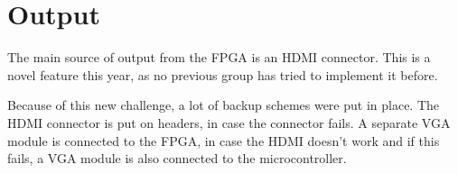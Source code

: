 \documentclass[../main/report.tex]{subfiles}
\begin{document}
\section{Output}
The main source of output from the FPGA is an HDMI connector.
This is a novel feature this year, as no previous group has tried to implement it before.

Because of this new challenge, a lot of backup schemes were put in place.
The HDMI connector is put on headers, in case the connector fails.
A separate VGA module is connected to the FPGA, in case the HDMI doesn't work and if this fails, a VGA module is also connected to the microcontroller.
\end{document}
